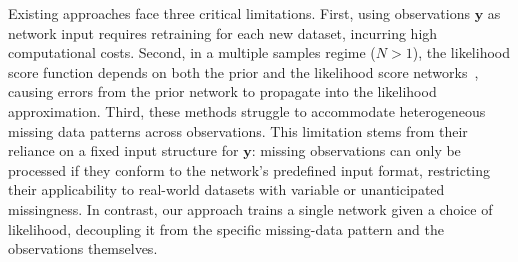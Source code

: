 Existing approaches face three critical limitations. First, using observations 
$\mathbf{y}$ as network input requires retraining for each new dataset, incurring high computational costs.
Second, in a multiple samples regime ($N>1$), the likelihood score function depends on both the prior and the likelihood score networks~\citep{geffner23a}, causing errors from the prior network to propagate into the likelihood approximation. Third, these methods struggle to accommodate heterogeneous missing data patterns across observations. This limitation stems from their reliance on a fixed input structure for $\mathbf{y}$: missing observations can only be processed if they conform to the network's predefined input format, restricting their applicability to real-world datasets with variable or unanticipated missingness. In contrast, our approach trains a single network given a choice of likelihood, decoupling it from the specific missing-data pattern and the observations themselves. 





